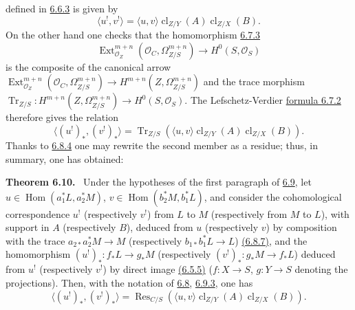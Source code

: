 \documentclass[11pt]{article}
\newenvironment{statement}[1]{\par\medskip\noindent\textbf{#1.}\ }{\par\medskip}
\DeclareMathOperator{\Hom}{Hom}
\DeclareMathOperator{\Ext}{Ext}
\providecommand{\cl}{\operatorname{cl}}
\providecommand{\OO}{\mathcal{O}}
\providecommand{\Hom}{\operatorname{Hom}}
\providecommand{\cl}{\operatorname{cl}}
\providecommand{\Hom}{\operatorname{Hom}}
\providecommand{\cl}{\operatorname{cl}}
\begin{document}
defined in \hyperref[sga5:III:equation:6.6.3]{6.6.3} is given by
\begin{equation}
\tag{6.9.4}\label{sga5:III:equation:6.9.4}
\langle u^!,v^!\rangle=\langle u,v\rangle\cl_{Z/Y}(A)\cl_{Z/X}(B).
\end{equation}
On the other hand one checks that the homomorphism \hyperref[sga5:III:equation:6.7.3]{6.7.3}
\[
\Ext^{m+n}_{\OO_Z}(\OO_C,\Omega^{m+n}_{Z/S})\longrightarrow H^0(S,\OO_S)
\]
is the composite of the canonical arrow $\Ext^{m+n}_{\OO_Z}(\OO_C,\Omega^{m+n}_{Z/S})\to H^{m+n}(Z,\Omega^{m+n}_{Z/S})$ and the trace morphism $\operatorname{Tr}_{Z/S}:H^{m+n}(Z,\Omega^{m+n}_{Z/S})\to H^0(S,\OO_S)$. The Lefschetz-Verdier \hyperref[sga5:III:equation:6.7.2]{formula 6.7.2} therefore gives the relation
\begin{equation}
\tag{6.9.5}\label{sga5:III:equation:6.9.5}
\langle (u^!)_*,(v^!)_*\rangle=\operatorname{Tr}_{Z/S}(\langle u,v\rangle\cl_{Z/Y}(A)\cl_{Z/X}(B)).
\end{equation}
Thanks to \hyperref[sga5:III:equation:6.8.4]{6.8.4} one may rewrite the second member as a residue; thus, in summary, one has obtained:


\label{sga5:III:theorem:6.10}\begin{statement}{Theorem 6.10}
Under the hypotheses of the first paragraph of \hyperref[sga5:III:subsection:6.9]{6.9}, let $u\in\Hom(a_1^*L,a_2^*M)$, $v\in\Hom(b_2^*M,b_1^*L)$, and consider the cohomological correspondence $u^!$ (respectively $v^!$) from $L$ to $M$ (respectively from $M$ to $L$), with support in $A$ (respectively $B$), deduced from $u$ (respectively $v$) by composition with the trace $a_{2*}a_2^*M\to M$ (respectively $b_{1*}b_1^*L\to L$) \hyperref[sga5:III:equation:6.8.7]{(6.8.7)}, and the homomorphism $(u^!)_*:f_*L\to g_*M$ (respectively $(v^!)_*:g_*M\to f_*L$) deduced from $u^!$ (respectively $v^!$) by direct image \hyperref[sga5:III:equation:6.5.5]{(6.5.5)} ($f:X\to S$, $g:Y\to S$ denoting the projections). Then, with the notation of \hyperref[sga5:III:subsection:6.8]{6.8}, \hyperref[sga5:III:equation:6.9.3]{6.9.3}, one has
\begin{equation}
\tag{6.10.1}\label{sga5:III:equation:6.10.1}
\langle (u^!)_*,(v^!)_*\rangle=\operatorname{Res}_{C/S}(\langle u,v\rangle\cl_{Z/Y}(A)\cl_{Z/X}(B)).
\end{equation}
\end{statement}
\end{document}
